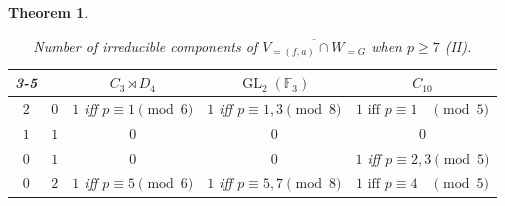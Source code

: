 \documentclass{amsart}
\newcommand{\GL}{\operatorname{GL}}
\numberwithin{equation}{section}
\newtheorem{theorem}{Theorem}[section]  %
\theoremstyle{definition}
\theoremstyle{remark}
\begin{document}
\begin{theorem}
\begin{table}[H]
\centering
\begin{tabular}{cc|c|c|c|}
\cline{3-5}
                                                &                           & \cellcolor[HTML]{a7c957}$C_3\rtimes D_4$ & \cellcolor[HTML]{a7c957}$\GL_2(\mathbb{F}_3)$ & \cellcolor[HTML]{a7c957}$C_{10}$ \\ \hline
\multicolumn{1}{|c|}{\cellcolor[HTML]{a7c957}$2$} & \cellcolor[HTML]{a7c957}$0$ & $1$ iff $p\equiv 1\pmod 6$ & $1$ iff $p\equiv1,3 \pmod 8$ & $1 \text{ iff } p \equiv 1\phantom{,2} \pmod 5$ \\ \hline
\multicolumn{1}{|c|}{\cellcolor[HTML]{a7c957}$1$} & \cellcolor[HTML]{a7c957}$1$ & {\color[HTML]{C0C0C0} $0$} & {\color[HTML]{C0C0C0} $0$} & {\color[HTML]{C0C0C0} $0$} \\ \hline
\multicolumn{1}{|c|}{\cellcolor[HTML]{a7c957}$0$} & \cellcolor[HTML]{a7c957}$1$ & {\color[HTML]{C0C0C0} $0$} & {\color[HTML]{C0C0C0} $0$} & $1$ iff $p\equiv2,3 \pmod 5$ \\ \hline
\multicolumn{1}{|c|}{\cellcolor[HTML]{a7c957}$0$} & \cellcolor[HTML]{a7c957}$2$ & $1$ iff $p\equiv 5 \pmod 6$ & $1$ iff $ p\equiv 5,7 \pmod 8$ & $1 \text{ iff } p \equiv 4\phantom{,2} \pmod 5$ \\ \hline
\end{tabular}
\caption{Number of irreducible components of $\overline{V_{=(f,a)}\cap W_{= G}}$ when $p\geq7$ (II).}
\label{tableII}
\end{table}


\end{theorem}
\end{document}
